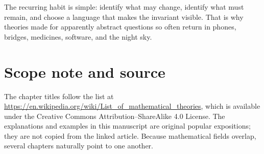 \documentclass[11pt,oneside]{book}
\begin{document}
The recurring habit is simple: identify what may change, identify what must remain, and choose a language that makes the invariant visible. That is why theories made for apparently abstract questions so often return in phones, bridges, medicines, software, and the night sky.

\chapter*{Scope note and source}
The chapter titles follow the list at \url{https://en.wikipedia.org/wiki/List_of_mathematical_theories}, which is available under the Creative Commons Attribution--ShareAlike 4.0 License. The explanations and examples in this manuscript are original popular expositions; they are not copied from the linked article. Because mathematical fields overlap, several chapters naturally point to one another.
\end{document}

